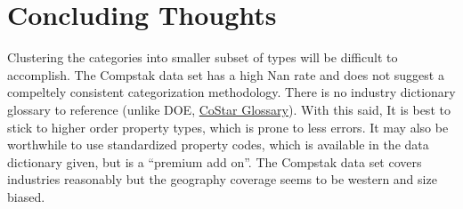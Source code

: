\documentclass[
  12pt]{article}
\begin{document}
\begin{figure}


\caption{\label{fig-heatmap_fix}}

\end{figure}%

\section{Concluding Thoughts}\label{concluding-thoughts}

Clustering the categories into smaller subset of types will be difficult
to accomplish. The Compstak data set has a high Nan rate and does not
suggest a compeltely consistent categorization methodology. There is no
industry dictionary glossary to reference (unlike DOE,
\href{https://www.costar.com/about/costar-glossary}{CoStar Glossary}).
With this said, It is best to stick to higher order property types,
which is prone to less errors. It may also be worthwhile to use
standardized property codes, which is available in the data dictionary
given, but is a ``premium add on''. The Compstak data set covers
industries reasonably but the geography coverage seems to be western and
size biased.
\end{document}
